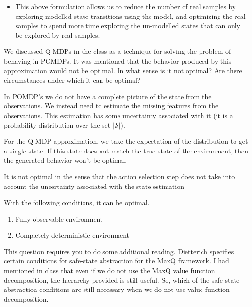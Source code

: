 \documentclass[addpoints,12pt,solution]{exam}
\begin{document}
\begin{questions}
\begin{solution}
\begin{itemize}
                \item This above formulation allows us to reduce the number of real samples by exploring modelled state transitions using the model,
                and optimizing the real samples to spend more time exploring the un-modelled states that can only be explored by real samples.
            \end{itemize}

        \end{solution}

        \question[4] We discussed Q-MDPs in the class as a technique for solving the problem of behaving in POMDPs. It was mentioned that the behavior produced by this approximation would not be optimal. In what sense is it not optimal? Are there circumstances under which it can be optimal?

        \begin{solution}
            In POMDP's we do not have a complete picture of the state from the observations.
            We instead need to estimate the missing features from the observations.
            This estimation has some uncertainty associated with it (it is a probability distribution over the set $|\mathcal{S}|$).

            For the Q-MDP approximation, we take the expectation of the distribution to get a single state.
            If this state does not match the true state of the environment, then the generated behavior won't be optimal.

            It is not optimal in the sense that the action selection step does not take into account the uncertainty
            associated with the state estimation.

            With the following conditions, it can be optimal.
            \begin{enumerate}
                \item Fully observable environment
                \item Completely deterministic environment
            \end{enumerate}

        \end{solution}

        \question[3] This question requires you to do some additional reading. Dietterich specifies certain conditions for safe-state abstraction for the MaxQ framework. I had mentioned in class that even if we do not use the MaxQ value function decomposition, the hierarchy provided is still useful. So, which of the safe-state abstraction conditions are still necessary when we do not use value function decomposition.
        \begin{solution}



\end{solution}
\end{questions}
\end{document}
